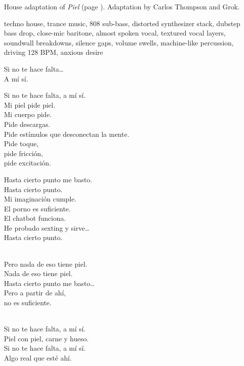 
\begin{notes}
House adaptation of \emph{Piel} (page \pageref{sec:piel}). Adaptation by Carlos Thompson and Grok.
\end{notes}
\begin{style}
techno house, trance music, 808 sub-bass, distorted synthesizer stack, dubstep bass drop, close-mic baritone, almost spoken vocal, textured vocal layers, soundwall breakdowns, silence gaps, volume swells, machine-like percussion, driving 128 BPM, anxious desire
\end{style}
\begin{lyrics}
Si no te hace falta…\\
A mí sí.

Si no te hace falta, a mí sí.\\
Mi piel pide piel.\\
Mi cuerpo pide.\\
Pide descargas.\\
Pide estímulos que desconectan la mente.\\
Pide toque,\\
pide fricción,\\
pide excitación.

Hasta cierto punto me basto.\\
Hasta cierto punto.\\
Mi imaginación cumple.\\
El porno es suficiente.\\
El chatbot funciona.\\
He probado sexting y sirve…\\
Hasta cierto punto.

\\
Pero nada de eso tiene piel.\\
Nada de eso tiene piel.\\
Hasta cierto punto me basto…\\
Pero a partir de ahí,\\
no es suficiente.

\\
Si no te hace falta, a mí sí.\\
Piel con piel, carne y hueso.\\
Si no te hace falta, a mí sí.\\
Algo real que esté ahí.


\end{lyrics}
